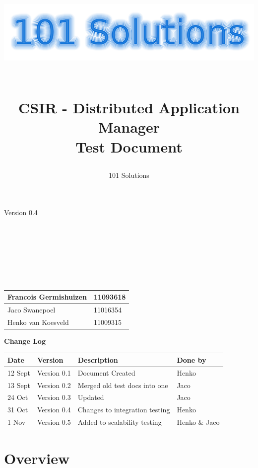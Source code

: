 \documentclass[a4paper,12pt,final]{article}
\title{
\begin{center}
  	\includegraphics[scale=0.3]{101Logo.png} 
  \end{center}
  \textbf{\\}
CSIR - Distributed Application Manager\\
Test Document\\
}
\author{101 Solutions}
\begin{document}
\maketitle
\begin{center}
Version 0.4
\end{center}
\textbf{\\}
\textbf{\\}
\textbf{\\}
\textbf{\\}
\textbf{\\}
\textbf{\\}
\begin{center}
\begin{tabular}{|l|l|}
\hline
Francois Germishuizen & 11093618\\
\hline
Jaco Swanepoel & 11016354\\
\hline
Henko van Koesveld & 11009315\\
\hline
\end{tabular}
\end{center}
\thispagestyle{empty}
\newpage
\thispagestyle{empty}
\textbf{\large{Change Log}}
\vspace{6pt}\newline
\begin{tabular}{|l|l|l|l|}
\hline
\textbf{Date} & \textbf{Version} & \textbf{Description} & \textbf{Done by}\\
\hline
12 Sept & Version 0.1 & Document Created&Henko\\
\hline
13 Sept & Version 0.2 & Merged old test docs into one&Jaco\\
\hline
24 Oct & Version 0.3 & Updated&Jaco\\
\hline
31 Oct & Version 0.4 &  Changes to integration testing & Henko\\
\hline
1 Nov & Version 0.5 &  Added to scalability testing & Henko \& Jaco\\
\hline
\end{tabular}
\newpage
\tableofcontents
\thispagestyle{empty}
\newpage

\section{Overview}
\end{document}
